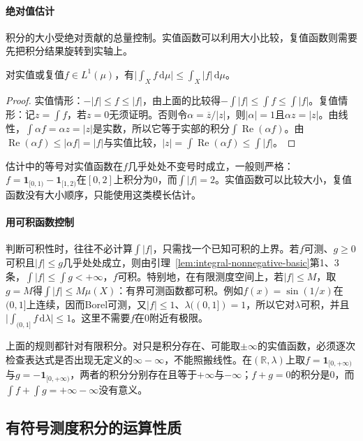 \paragraph{绝对值估计}
积分的大小受绝对贡献的总量控制。实值函数可以利用大小比较，复值函数则需要先把积分结果旋转到实轴上。

\begin{theorem}[积分的绝对值估计]
\label{thm:integral-abs-bound}
对实值或复值$f\in L^1(\mu)$，有$\bigl|\int_Xf\,\mathrm d\mu\bigr|\le\int_X|f|\,\mathrm d\mu$。
\end{theorem}

\begin{proof}
实值情形：$-|f|\le f\le|f|$，由上面的比较得$-\int|f|\le\int f\le\int|f|$。复值情形：记$z=\int f$，若$z=0$无须证明。否则令$\alpha=\overline z/|z|$，则$|\alpha|=1$且$\alpha z=|z|$。由线性，$\int\alpha f=\alpha z=|z|$是实数，所以它等于实部的积分$\int\operatorname{Re}(\alpha f)$。由$\operatorname{Re}(\alpha f)\le|\alpha f|=|f|$与实值比较，$|z|=\int\operatorname{Re}(\alpha f)\le\int|f|$。
\end{proof}

估计中的等号对实值函数在$f$几乎处处不变号时成立，一般则严格：$f=\mathbf 1_{[0,1)}-\mathbf 1_{[1,2)}$在$[0,2]$上积分为$0$，而$\int|f|=2$。实值函数可以比较大小，复值函数没有大小顺序，只能使用这类模长估计。

\paragraph{用可积函数控制}
判断可积性时，往往不必计算$\int|f|$，只需找一个已知可积的上界。若$f$可测、$g\ge0$可积且$|f|\le g$几乎处处成立，则由引理~\ref{lem:integral-nonnegative-basic}第1、3条，$\int|f|\le\int g<+\infty$，$f$可积。特别地，在有限测度空间上，若$|f|\le M$，取$g=M$得$\int|f|\le M\mu(X)$：有界可测函数都可积。例如$f(x)=\sin(1/x)$在$(0,1]$上连续，因而Borel可测，又$|f|\le1$、$\lambda((0,1])=1$，所以它对$\lambda$可积，并且$\bigl|\int_{(0,1]}f\,\mathrm d\lambda\bigr|\le1$。这里不需要$f$在$0$附近有极限。

上面的规则都针对有限积分。对只是积分存在、可能取$\pm\infty$的实值函数，必须逐次检查表达式是否出现无定义的$\infty-\infty$，不能照搬线性。在$(\mathbb R,\lambda)$上取$f=\mathbf 1_{[0,+\infty)}$与$g=-\mathbf 1_{[0,+\infty)}$，两者的积分分别存在且等于$+\infty$与$-\infty$；$f+g=0$的积分是$0$，而$\int f+\int g=+\infty-\infty$没有意义。

\subsection{有符号测度积分的运算性质}
\label{sec:integral-signed-measure-rules}


